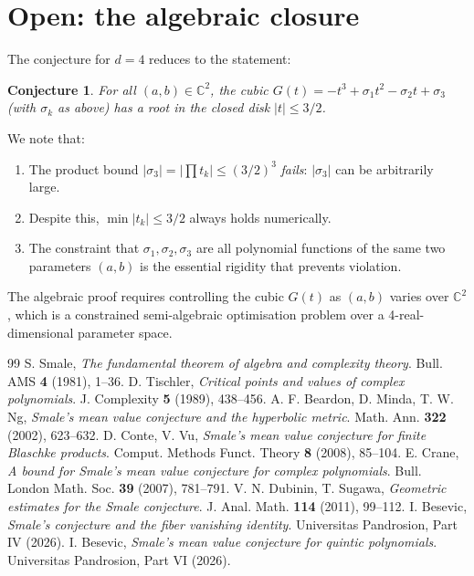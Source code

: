 \documentclass[11pt,a4paper]{article}
\newtheorem{conjecture}[theorem]{Conjecture}
\begin{document}
\section{Open: the algebraic closure}

The conjecture for $d = 4$ reduces to the statement:

\begin{conjecture}
For all $(a, b) \in \mathbb{C}^2$, the cubic $G(t) = -t^3 + \sigma_1 t^2 - \sigma_2 t + \sigma_3$ (with $\sigma_k$ as above) has a root in the closed disk $|t| \le 3/2$.
\end{conjecture}

We note that:
\begin{enumerate}
\item The product bound $|\sigma_3| = |\prod t_k| \le (3/2)^3$ \emph{fails}: $|\sigma_3|$ can be arbitrarily large.
\item Despite this, $\min |t_k| \le 3/2$ always holds numerically.
\item The constraint that $\sigma_1, \sigma_2, \sigma_3$ are all polynomial functions of the same two parameters $(a, b)$ is the essential rigidity that prevents violation.
\end{enumerate}

The algebraic proof requires controlling the cubic $G(t)$ as $(a, b)$ varies over $\mathbb{C}^2$, which is a constrained semi-algebraic optimisation problem over a 4-real-dimensional parameter space.

\begin{thebibliography}{99}
 S. Smale, \textit{The fundamental theorem of algebra and complexity theory}. Bull. AMS \textbf{4} (1981), 1--36.
 D. Tischler, \textit{Critical points and values of complex polynomials}. J. Complexity \textbf{5} (1989), 438--456.
 A. F. Beardon, D. Minda, T. W. Ng, \textit{Smale's mean value conjecture and the hyperbolic metric}. Math. Ann. \textbf{322} (2002), 623--632.
 D. Conte, V. Vu, \textit{Smale's mean value conjecture for finite Blaschke products}. Comput. Methods Funct. Theory \textbf{8} (2008), 85--104.
 E. Crane, \textit{A bound for Smale's mean value conjecture for complex polynomials}. Bull. London Math. Soc. \textbf{39} (2007), 781--791.
 V. N. Dubinin, T. Sugawa, \textit{Geometric estimates for the Smale conjecture}. J. Anal. Math. \textbf{114} (2011), 99--112.
 I. Besevic, \textit{Smale's conjecture and the fiber vanishing identity}. Universitas Pandrosion, Part IV (2026).
 I. Besevic, \textit{Smale's mean value conjecture for quintic polynomials}. Universitas Pandrosion, Part VI (2026).
\end{thebibliography}
\end{document}
